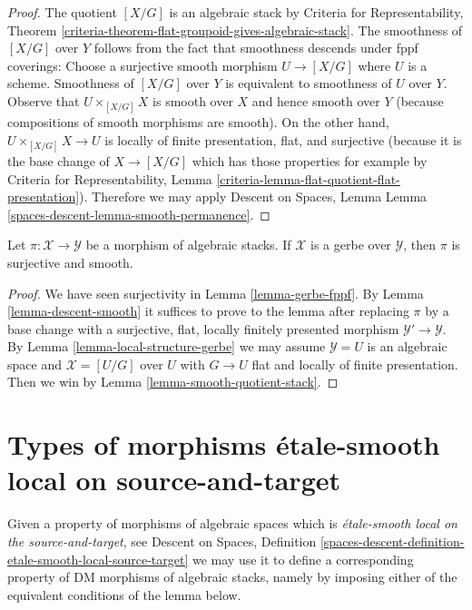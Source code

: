 \begin{proof}
The quotient $[X/G]$ is an algebraic stack by
Criteria for Representability, Theorem
\ref{criteria-theorem-flat-groupoid-gives-algebraic-stack}.
The smoothness of $[X/G]$ over $Y$ follows from the fact that smoothness
descends under fppf coverings:
Choose a surjective smooth morphism $U \to [X/G]$ where $U$ is a scheme.
Smoothness of $[X/G]$ over $Y$ is equivalent to smoothness of $U$ over $Y$.
Observe that $U \times_{[X/G]} X$ is smooth over $X$ and hence smooth
over $Y$ (because compositions of smooth morphisms are smooth).
On the other hand, $U \times_{[X/G]} X \to U$ is locally of
finite presentation, flat, and surjective (because it is
the base change of $X \to [X/G]$ which has those properties
for example by Criteria for Representability, Lemma
\ref{criteria-lemma-flat-quotient-flat-presentation}).
Therefore we may apply Descent on Spaces, Lemma
Lemma \ref{spaces-descent-lemma-smooth-permanence}.
\end{proof}

\begin{lemma}
\label{lemma-gerbe-smooth}
Let $\pi : \mathcal{X} \to \mathcal{Y}$ be a morphism of algebraic stacks.
If $\mathcal{X}$ is a gerbe over $\mathcal{Y}$, then $\pi$ is surjective
and smooth.
\end{lemma}

\begin{proof}
We have seen surjectivity in Lemma \ref{lemma-gerbe-fppf}.
By Lemma \ref{lemma-descent-smooth}
it suffices to prove to the lemma after replacing $\pi$ by a base change
with a surjective, flat, locally finitely presented morphism
$\mathcal{Y}' \to \mathcal{Y}$. By
Lemma \ref{lemma-local-structure-gerbe}
we may assume $\mathcal{Y} = U$ is an algebraic space and
$\mathcal{X} = [U/G]$ over $U$ with $G \to U$ flat and
locally of finite presentation.
Then we win by Lemma \ref{lemma-smooth-quotient-stack}.
\end{proof}





\section{Types of morphisms \'etale-smooth local on source-and-target}
\label{section-etale-smooth-local-source-target}

\noindent
Given a property of morphisms of algebraic spaces which is
{\it \'etale-smooth local on the source-and-target}, see
Descent on Spaces,
Definition \ref{spaces-descent-definition-etale-smooth-local-source-target}
we may use it to define a corresponding
property of DM morphisms of algebraic stacks, namely by imposing either of
the equivalent conditions of the lemma below.

